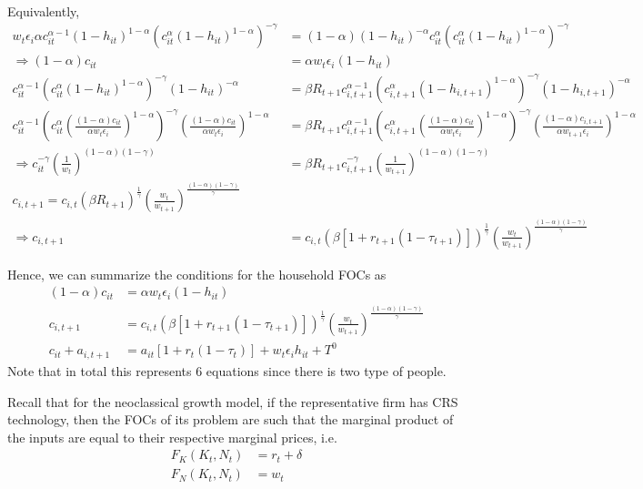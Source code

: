 \documentclass[12pt]{article}
\newcommand{\1}{{\bf 1}} %
\begin{document}
\begin{enumerate}[(1)]
	Equivalently,
	\begin{align*}	
w_t \epsilon_i	\alpha c_{it}^{\alpha-1}(1-h_{it})^{1-\alpha} \left( c_{it}^\alpha(1-h_{it})^{1-\alpha}\right) ^{-\gamma} &=   (1-\alpha) (1-h_{it})^{-\alpha}  c_{it}^\alpha \left( c_{it}^\alpha(1-h_{it})^{1-\alpha}\right) ^{-\gamma}  \\
	\Rightarrow (1-\alpha) c_{it}  &=  \alpha w_t \epsilon_i (1-h_{it}) \\
	c_{it}^{\alpha-1} \left( c_{it}^\alpha(1-h_{it})^{1-\alpha}\right) ^{-\gamma} (1-h_{it})^{-\alpha}  &= \beta R_{t+1}   c_{i,t+1}^{\alpha-1} \left( c_{i,t+1}^\alpha(1-h_{i,t+1})^{1-\alpha}\right) ^{-\gamma} (1-h_{i,t+1})^{-\alpha} \\
		c_{it}^{\alpha-1} \left( c_{it}^\alpha \left(\frac{(1-\alpha)c_{it}}{\alpha w_t \epsilon_i} \right)^{1-\alpha}\right) ^{-\gamma} \left(\frac{(1-\alpha)c_{it}}{\alpha w_t \epsilon_i} \right)^{1-\alpha} &= \beta R_{t+1} c_{i,t+1}^{\alpha-1} \left( c_{i,t+1}^\alpha \left(\frac{(1-\alpha)c_{it}}{\alpha w_t \epsilon_i} \right)^{1-\alpha}\right) ^{-\gamma} \left(\frac{(1-\alpha)c_{i,t+1}}{\alpha w_{t+1} \epsilon_i} \right)^{1-\alpha}\\
		\Rightarrow c_{it}^{-\gamma} \left( \frac{1}{w_t}\right) ^{(1-\alpha)(1-\gamma)} &= \beta R_{t+1} c_{i,t+1}^{-\gamma} \left( \frac{1}{w_{t+1}}\right) ^{(1-\alpha)(1-\gamma)}\\
		c_{i,t+1}= c_{i,t} \left( \beta R_{t+1}\right)^{\frac{1}{\gamma}}  \left( \frac{w_t}{w_{t+1}}\right) ^{\frac{(1-\alpha)(1-\gamma)}{\gamma}}\\
		\Rightarrow c_{i,t+1} &= c_{i,t} \left( \beta [1+r_{t+1}(1-\tau_{t+1})]\right)^{\frac{1}{\gamma}}  \left( \frac{w_t}{w_{t+1}}\right) ^{\frac{(1-\alpha)(1-\gamma)}{\gamma}}
	\end{align*}
	
	Hence, we can summarize the conditions for the household FOCs as
		\begin{align}	(1-\alpha) c_{it}  &=  \alpha w_t \epsilon_i (1-h_{it})\\
		 c_{i,t+1} &= c_{i,t} \left( \beta [1+r_{t+1}(1-\tau_{t+1})]\right)^{\frac{1}{\gamma}}  \left( \frac{w_t}{w_{t+1}}\right) ^{\frac{(1-\alpha)(1-\gamma)}{\gamma}}\\
		c_{it}+a_{i,t+1}  &= a_{it}[1+r_t(1-\tau_t)]+ w_t\epsilon_ih_{it} + T^0 
	\end{align}
	Note that in total this represents $6$ equations since there is two type of people.
 	
 	Recall that for the neoclassical growth model, if the representative firm has CRS technology, then the FOCs of its problem are such that the marginal product of the inputs are equal to their respective marginal prices, i.e.
 			\begin{align}	
 			F_K(K_t,N_t) &= r_t+\delta\\
 			F_N(K_t,N_t) &= w_t
 	\end{align}
 	

\end{enumerate}
\end{document}
